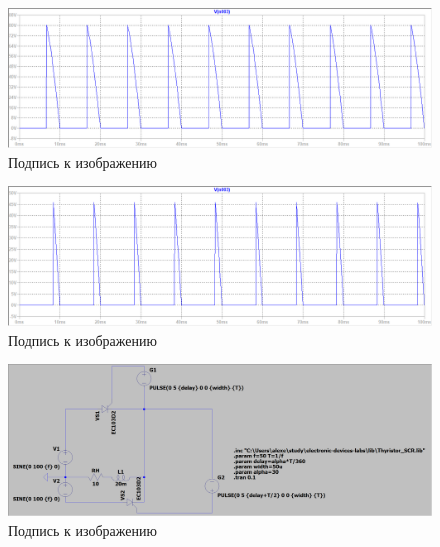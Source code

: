 \documentclass[a4paper, 12pt]{article}
\begin{document}
    \begin{figure}[H]
        \centering
        \includegraphics[scale=0.45]{a120.png}
        \captionsetup{skip=0pt}
        \caption{Подпись к изображению}
        \label{fig:a120}
    \end{figure}
    \begin{figure}[H]
        \centering
        \includegraphics[scale=0.45]{a150.png}
        \captionsetup{skip=0pt}
        \caption{Подпись к изображению}
        \label{fig:a150}
    \end{figure}


    \begin{figure}[H]
        \centering
        \includegraphics[scale=0.22]{scheme2.png}
        \captionsetup{skip=0pt}
        \caption{Подпись к изображению}
        \label{fig:scheme2}
    \end{figure}
\end{document}
